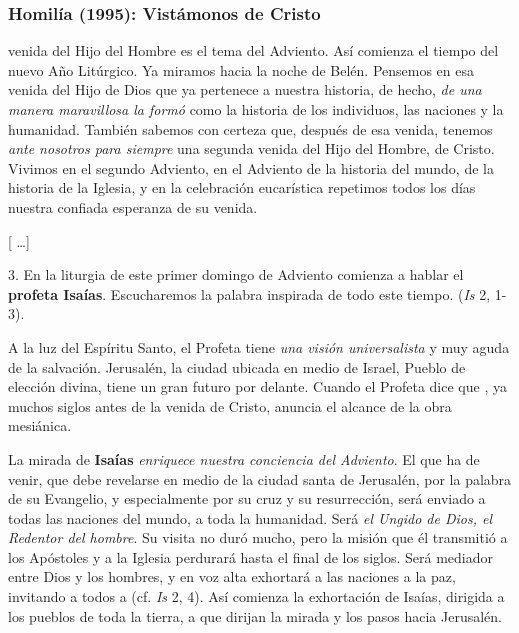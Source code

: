\newpage
\subsubsection{Homilía (1995): Vistámonos de Cristo}


\begin{body}
	 venida del Hijo del Hombre es el tema del Adviento. Así comienza el tiempo del nuevo Año Litúrgico. Ya miramos hacia la noche de Belén. Pensemos en esa venida del Hijo de Dios que ya pertenece a nuestra historia, de hecho, \emph{de una manera maravillosa la formó} como la historia de los individuos, las naciones y la humanidad. También sabemos con certeza que, después de esa venida, tenemos \emph{ante nosotros para siempre} una segunda venida del Hijo del Hombre, de Cristo. Vivimos en el segundo Adviento, en el Adviento de la historia del mundo, de la historia de la Iglesia, y en la celebración eucarística repetimos todos los días nuestra confiada esperanza de su venida.	 
	
	{[} \ldots{}{]} 
	
	3. En la liturgia de este primer domingo de Adviento comienza a hablar el \textbf{profeta Isaías}. Escucharemos la palabra inspirada de todo este tiempo.  (\emph{Is} 2, 1-3). 
	
	A la luz del Espíritu Santo, el Profeta tiene \emph{una visión universalista} y muy aguda de la salvación. Jerusalén, la ciudad ubicada en medio de Israel, Pueblo de elección divina, tiene un gran futuro por delante. Cuando el Profeta dice que , ya muchos siglos antes de la venida de Cristo, anuncia el alcance de la obra mesiánica. 
	
	La mirada de \textbf{Isaías} \emph{enriquece nuestra conciencia del Adviento}. El que ha de venir, que debe revelarse  en medio de la ciudad santa de Jerusalén, por la palabra de su Evangelio, y especialmente por su cruz y su resurrección, será enviado a todas las naciones del mundo, a toda la humanidad. Será \emph{el Ungido de Dios, el Redentor del hombre}. Su visita no duró mucho, pero la misión que él transmitió a los Apóstoles y a la Iglesia perdurará hasta el final de los siglos. Será mediador entre Dios y los hombres, y en voz alta exhortará a las naciones a la paz, invitando a todos a  (cf. \emph{Is} 2, 4). Así comienza la exhortación de Isaías, dirigida a los pueblos de toda la tierra, a que dirijan la mirada y los pasos hacia Jerusalén. 
	

\end{body}
